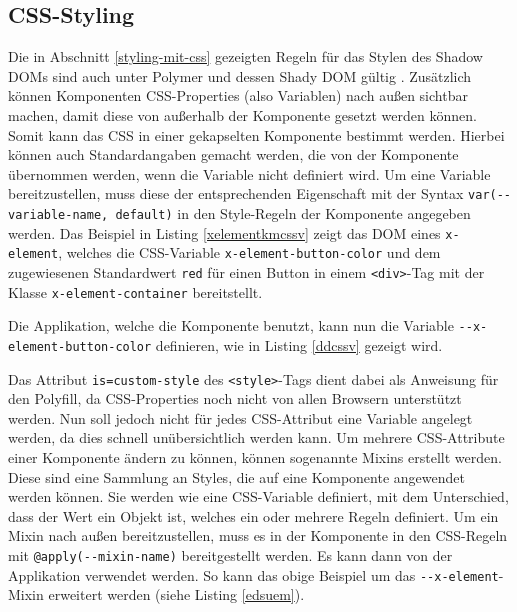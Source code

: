


\subsection{CSS-Styling}\label{css-styling}

Die in Abschnitt \ref{styling-mit-css} gezeigten Regeln für das Stylen des Shadow \ac{DOM}s sind auch unter Polymer und dessen Shady \ac{DOM} gültig \cite{citeulike:13915080}. Zusätzlich können Komponenten \ac{CSS}-Properties (also Variablen) nach außen sichtbar machen, damit diese von außerhalb der Komponente gesetzt werden können. Somit kann das \ac{CSS} in einer gekapselten Komponente bestimmt werden. Hierbei können auch Standardangaben gemacht werden, die von der Komponente übernommen werden, wenn die Variable nicht definiert wird. Um eine Variable bereitzustellen, muss diese der entsprechenden Eigenschaft mit der Syntax \texttt{var(-\/-variable-name,\ default)} in den Style-Regeln der Komponente angegeben werden. Das Beispiel in Listing \ref{xelementkmcssv} zeigt das \ac{DOM} eines \texttt{x-element}, welches die \ac{CSS}-Variable \texttt{x-element-button-color} und dem zugewiesenen Standardwert \texttt{red} für einen Button in einem \texttt{\textless{}div\textgreater{}}-Tag mit der Klasse \texttt{x-element-container} bereitstellt.



Die Applikation, welche die Komponente benutzt, kann nun die Variable \texttt{-\/-x-element-button-color} definieren, wie in Listing \ref{ddcssv} gezeigt wird.



Das Attribut \texttt{is=\dq custom-style\dq} des \texttt{\textless{}style\textgreater{}}-Tags dient dabei als Anweisung für den Polyfill, da \ac{CSS}-Properties noch nicht von allen Browsern unterstützt werden. Nun soll jedoch nicht für jedes \ac{CSS}-Attribut eine Variable angelegt werden, da dies schnell unübersichtlich werden kann. Um mehrere \ac{CSS}-Attribute einer Komponente ändern zu können, können sogenannte Mixins erstellt werden. Diese sind eine Sammlung an Styles, die auf eine Komponente angewendet werden können. Sie werden wie eine \ac{CSS}-Variable definiert, mit dem Unterschied, dass der Wert ein Objekt ist, welches ein oder mehrere Regeln definiert. Um ein Mixin nach außen bereitzustellen, muss es in der Komponente in den \ac{CSS}-Regeln mit \texttt{@apply(-\/-mixin-name)} bereitgestellt werden. Es kann dann von der Applikation verwendet werden. So kann das obige Beispiel um das \texttt{-\/-x-element}-Mixin erweitert werden (siehe Listing \ref{edsuem}).

